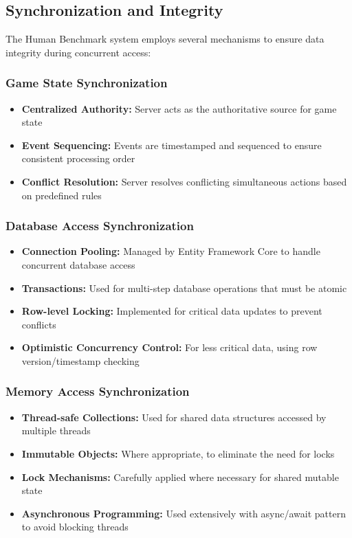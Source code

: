 \subsection{Synchronization and Integrity}

The Human Benchmark system employs several mechanisms to ensure data integrity during concurrent access:

\subsubsection{Game State Synchronization}

\begin{itemize}
    \item \textbf{Centralized Authority:} Server acts as the authoritative source for game state
    \item \textbf{Event Sequencing:} Events are timestamped and sequenced to ensure consistent processing order
    \item \textbf{Conflict Resolution:} Server resolves conflicting simultaneous actions based on predefined rules
\end{itemize}

\subsubsection{Database Access Synchronization}

\begin{itemize}
    \item \textbf{Connection Pooling:} Managed by Entity Framework Core to handle concurrent database access
    \item \textbf{Transactions:} Used for multi-step database operations that must be atomic
    \item \textbf{Row-level Locking:} Implemented for critical data updates to prevent conflicts
    \item \textbf{Optimistic Concurrency Control:} For less critical data, using row version/timestamp checking
\end{itemize}

\subsubsection{Memory Access Synchronization}

\begin{itemize}
    \item \textbf{Thread-safe Collections:} Used for shared data structures accessed by multiple threads
    \item \textbf{Immutable Objects:} Where appropriate, to eliminate the need for locks
    \item \textbf{Lock Mechanisms:} Carefully applied where necessary for shared mutable state
    \item \textbf{Asynchronous Programming:} Used extensively with async/await pattern to avoid blocking threads
\end{itemize}

